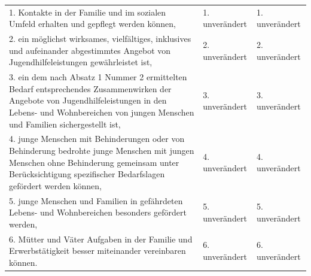 \documentclass[10pt,a4paper,landscape]{article}
\begin{document}
\begin{longtable}{|L{8.2cm}|L{8.2cm}|L{8.2cm}|}
\hhline{|---|}
1.  \newline Kontakte in der Familie und im sozialen  \newline Umfeld erhalten und gepflegt werden  \newline können, & 1. unverändert & 1. unverändert \\
\hhline{|---|}
2.  \newline ein möglichst wirksames, vielfältiges,  \newline inklusives und aufeinander abgestimmtes  \newline Angebot von Jugendhilfeleistungen  \newline gewährleistet ist, & 2. unverändert & 2. unverändert \\
\hhline{|---|}
3.  \newline ein dem nach Absatz 1 Nummer 2  \newline ermittelten Bedarf entsprechendes  \newline Zusammenwirken der Angebote von  \newline Jugendhilfeleistungen in den Lebens- und  \newline Wohnbereichen von jungen Menschen und  \newline Familien sichergestellt ist, & 3. unverändert & 3. unverändert \\
\hhline{|---|}
4.  \newline junge Menschen mit Behinderungen oder  \newline von Behinderung bedrohte junge  \newline Menschen mit jungen Menschen ohne  \newline Behinderung gemeinsam unter  \newline Berücksichtigung spezifischer  \newline Bedarfslagen gefördert werden können, & 4. unverändert & 4. unverändert \\
\hhline{|---|}
5.  \newline junge Menschen und Familien in  \newline gefährdeten Lebens- und Wohnbereichen  \newline besonders gefördert werden, & 5. unverändert & 5. unverändert \\
\hhline{|---|}
6.  \newline Mütter und Väter Aufgaben in der Familie  \newline und Erwerbstätigkeit besser miteinander  \newline vereinbaren können. & 6. unverändert & 6. unverändert \\

\end{longtable}
\end{document}
